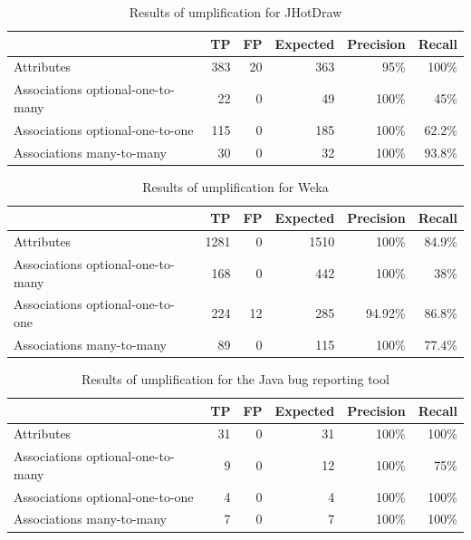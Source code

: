 \begin{table}[h]
\caption{Results of umplification for JHotDraw}
\label{table:umplifiedResultsSystems1}
\centering 
\begin{tabular}{p{4cm}|rrrrr}
\toprule
\rowcolor[HTML]{BBDAFF}
\textbf{} & \textbf{TP}  & \textbf{FP} & \textbf{Expected} & \textbf{Precision}  & \textbf{Recall}\\ \hline
Attributes & 383  & 20  & 363  & 95\% & 100\% \\ \hline
Associations optional-one-to-many &  22 & 0 & 49 & 100\% & 45\% \\ \hline
Associations optional-one-to-one &  115 & 0 & 185  & 100\% & 62.2\% \\ \hline
Associations many-to-many & 30 & 0 & 32 & 100\% & 93.8\%\\ \bottomrule
\end{tabular}
\end{table}

\begin{table}[h]
\caption{Results of umplification for Weka}
\label{table:umplifiedResultsSystems2}
\centering 
\begin{tabular}{p{4cm}|rrrrr}
\toprule
\rowcolor[HTML]{BBDAFF}
\textbf{} & \textbf{TP}  & \textbf{FP}  & \textbf{Expected} & \textbf{Precision}  & \textbf{Recall}\\ \hline
Attributes & 1281	& 0	& 1510 & 100\%	& 84.9\% \\ \hline
Associations optional-one-to-many &  168 & 0 & 442 & 100\% & 38\% \\ \hline
Associations optional-one-to-one &  224 & 12 & 285 & 94.92\%  & 86.8\% \\ \hline
Associations many-to-many & 89 & 0 & 115 & 100\% & 77.4\% \\ \bottomrule
\end{tabular}
\end{table}

\begin{table}[h]
\caption{Results of umplification for the Java bug reporting tool}
\label{table:umplifiedResultsSystems3}
\centering 
\begin{tabular}{p{4cm}|rrrrr}
\toprule
\rowcolor[HTML]{BBDAFF}
\textbf{} & \textbf{TP}  & \textbf{FP}  & \textbf{Expected} & \textbf{Precision}  & \textbf{Recall}\\ \hline
Attributes & 31 & 0  & 31  & 100\% & 100\% \\ \hline
Associations optional-one-to-many &  9 & 0 & 12  & 100\%& 75\% \\\hline
Associations optional-one-to-one &  4  & 0 & 4  & 100\% & 100\% \\ \hline
Associations many-to-many & 7 & 0 & 7 & 100\% & 100\%\\ \bottomrule
\end{tabular}
\end{table}

